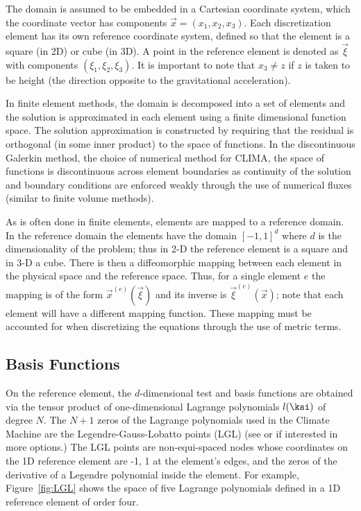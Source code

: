 \documentclass{report}
\numberwithin{equation}{section}
\begin{document}
The domain is assumed to be embedded in a Cartesian coordinate system, which the coordinate vector has components $\vec{x} = (x_{1}, x_{2}, x_{3})$. 
Each discretization element has its own reference coordinate system, defined so that the element is a square (in 2D) or cube (in 3D). 
A point in the reference element is denoted as $\vec{\xi}$ with components $(\xi_{1}, \xi_{2}, \xi_{3})$.  
It is important to note that $x_{3} \ne z$ if $z$ is taken to be height (the direction opposite to the gravitational acceleration).

In finite element methods, the domain is decomposed into a set of elements and
the solution is approximated in each element using a finite dimensional function
space. The solution approximation is constructed by requiring that the residual
is orthogonal (in some inner product) to the space of functions. In the
discontinuous Galerkin method, the choice of numerical method for CLIMA,
the space of functions is discontinuous across element boundaries as continuity
of the solution and boundary conditions are enforced weakly through the use of
numerical fluxes (similar to finite volume methods).

As is often done in finite elements, elements are mapped to a reference domain.
In the reference domain the elements have the domain ${[-1, 1]}^d$ where $d$ is
the dimensionality of the problem; thus in 2-D the reference element is a square
and in 3-D a cube. There is then a diffeomorphic mapping between each element in
the physical space and the reference space. Thus, for a single element $e$ the
mapping is of the form $\vec{x}^{(e)}(\vec{\xi})$ and its inverse is
$\vec{\xi}^{(e)}(\vec{x})$; note that each element will have a different mapping
function. These mapping must be accounted for when discretizing the equations
through the use of metric terms.

\subsection{Basis Functions}

On the reference element, the $d$-dimensional test and basis functions are  obtained via the tensor product of one-dimensional Lagrange polynomials $l(\ksi)$ of degree $N$. The $N+1$ zeros of the Lagrange polynomials used in the Climate Machine are the Legendre-Gauss-Lobatto points (LGL) (see \cite{hesthaven:2008} or \cite{karniadakis:2005} if interested in more options.) The LGL points are non-equi-spaced nodes whose coordinates on the 1D reference element are -1, 1 at the element's edges, and the zeros of the derivative of a Legendre polynomial inside the element. For example, Figure~\ref{fig:LGL} shows the space of five Lagrange polynomials defined in a 1D reference element of order four.
\end{document}
